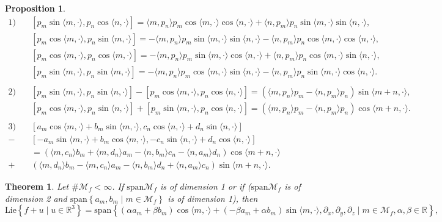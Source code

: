 \documentclass[10pt]{article}
\newcommand{\p}{\partial}
\newcommand{\R}{{\mathbb R}}
\newcommand{\M}{{\mathcal M}}
\newcommand{\la}{\langle}
\newcommand{\ra}{\rangle}
\newtheorem{theorem}{Theorem}
\newtheorem{prop}{Proposition}
\begin{document}
\begin{prop} \label{formulas T3}
\begin{align*}
    1)\quad &[p_m\sin\la m,\cdot \ra,p_n\cos \la n,\cdot \ra]=\la m,p_n\ra p_m\cos \la m,\cdot \ra \cos \la n,\cdot\ra +\la n,p_m\ra p_n\sin \la m,\cdot \ra \sin \la n,\cdot \ra,  \\
    &[p_m\cos \la m,\cdot \ra,p_n \sin \la m,\cdot \ra]=-\la m,p_n\ra p_m\sin \la m,\cdot \ra \sin \la n,\cdot\ra -\la n,p_m\ra p_n\cos \la m,\cdot \ra \cos \la n,\cdot \ra, \\
    &[p_m\cos \la m,\cdot \ra,p_n \cos \la m,\cdot \ra]=-\la m,p_n\ra p_m\sin \la m,\cdot \ra \cos \la n,\cdot\ra +\la n,p_m\ra p_n\cos \la m,\cdot \ra \sin \la n,\cdot \ra, \\
    &[p_m\sin \la m,\cdot \ra,p_n \sin \la m,\cdot \ra]=-\la m,p_n\ra p_m\cos \la m,\cdot \ra \sin \la n,\cdot\ra -\la n,p_m\ra p_n\sin \la m,\cdot \ra \cos \la n,\cdot \ra. \\ \\
    2)\quad &[p_m\sin \la m,\cdot \ra,p_n\sin\la n,\cdot\ra ]-[p_m\cos \la m,\cdot \ra,p_n\cos \la n,\cdot \ra ]
    =(\la m,p_n\ra p_m - \la n,p_m\ra p_n)\sin \la m+n,\cdot \ra,\\
    &[p_m\cos \la m,\cdot \ra,p_n\sin\la n,\cdot\ra ]+[p_m\sin \la m,\cdot \ra,p_n\cos \la n,\cdot \ra ]
    =(\la m,p_n\ra p_m - \la n,p_m\ra p_n)\cos \la m+n,\cdot \ra.\\ \\
    3) \quad &[a_m\cos\la m,\cdot \ra+b_m\sin \la m,\cdot \ra,c_n\cos \la n,\cdot \ra+d_n \sin \la n,\cdot \ra]\\
        -&[-a_m\sin\la m,\cdot \ra+b_m\cos \la m,\cdot \ra,-c_n\sin \la n,\cdot \ra+d_n \cos \la n,\cdot \ra]\\
        &=(\la m,c_n\ra b_m+\la m,d_n\ra a_m- \la n,b_m \ra c_n - \la n,a_m \ra d_n)\cos \la m+n,\cdot \ra \\
        +&(\la m,d_n\ra b_m-\la m,c_n \ra a_m -\la n,b_m \ra d_n+\la n,a_m \ra c_n)\sin \la m+n,\cdot \ra.
    \end{align*}
\end{prop}


\begin{theorem} \label{theorem : appendix T3 span1}
     Let $\# \M_f < \infty$. If $\mathrm{span}\M_f$ is of dimension 1 or if ($\mathrm{span}\M_f$ is of dimension 2 and $\mathrm{span}\left\{a_m,b_m \mid m \in \M_f\right\}$ is of dimension 1), then 
        \begin{equation*}
            \mathrm{Lie}\left\{f+u \mid u \in \R^3\right\}=\mathrm{span}\left\{(\alpha a_m + \beta b_m)\cos \la m,\cdot \ra + (-\beta a_m + \alpha b_m)\sin \la m,\cdot \ra,\p_x,\p_y,\p_z \mid m\in \M_f, \alpha,\beta \in \R\right\},
        \end{equation*}
\end{theorem}
\end{document}
